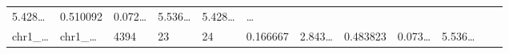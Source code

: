 \documentclass[
]{article}
\begin{document}
\begin{longtable}[]{@{}llllllllllll@{}}
\begin{minipage}[t]{0.08\columnwidth}
5.428\ldots{}\strut
\end{minipage} & \begin{minipage}[t]{0.06\columnwidth}\raggedright
0.510092\strut
\end{minipage} & \begin{minipage}[t]{0.06\columnwidth}\raggedright
0.072\ldots{}\strut
\end{minipage} & \begin{minipage}[t]{0.09\columnwidth}\raggedright
5.536\ldots{}\strut
\end{minipage} & \begin{minipage}[t]{0.06\columnwidth}\raggedright
5.428\ldots{}\strut
\end{minipage} & \begin{minipage}[t]{0.02\columnwidth}\raggedright
\ldots{}\strut
\end{minipage}\tabularnewline
\begin{minipage}[t]{0.06\columnwidth}\raggedright
chr1\_\ldots{}\strut
\end{minipage} & \begin{minipage}[t]{0.06\columnwidth}\raggedright
chr1\_\ldots{}\strut
\end{minipage} & \begin{minipage}[t]{0.06\columnwidth}\raggedright
4394\strut
\end{minipage} & \begin{minipage}[t]{0.06\columnwidth}\raggedright
23\strut
\end{minipage} & \begin{minipage}[t]{0.06\columnwidth}\raggedright
24\strut
\end{minipage} & \begin{minipage}[t]{0.06\columnwidth}\raggedright
0.166667\strut
\end{minipage} & \begin{minipage}[t]{0.08\columnwidth}\raggedright
2.843\ldots{}\strut
\end{minipage} & \begin{minipage}[t]{0.06\columnwidth}\raggedright
0.483823\strut
\end{minipage} & \begin{minipage}[t]{0.06\columnwidth}\raggedright
0.073\ldots{}\strut
\end{minipage} & \begin{minipage}[t]{0.09\columnwidth}\raggedright
5.536\ldots{}\strut
\end{minipage} & \begin{minipage}[t]{0.06\columnwidth}\raggedright

\end{minipage}
\end{longtable}
\end{document}
